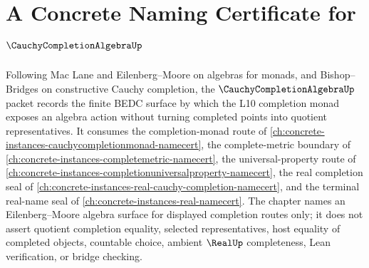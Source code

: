\chapter{A Concrete Naming Certificate for $\CauchyCompletionAlgebraUp$}
\label{ch:concrete-instances-cauchy-completion-algebra-namecert}

Following Mac Lane and Eilenberg--Moore on algebras for monads, and Bishop--Bridges on constructive Cauchy completion, the $\CauchyCompletionAlgebraUp$ packet records the finite BEDC surface by which the L10 completion monad exposes an algebra action without turning completed points into quotient representatives. It consumes the completion-monad route of \autoref{ch:concrete-instances-cauchycompletionmonad-namecert}, the complete-metric boundary of \autoref{ch:concrete-instances-completemetric-namecert}, the universal-property route of \autoref{ch:concrete-instances-completionuniversalproperty-namecert}, the real completion seal of \autoref{ch:concrete-instances-real-cauchy-completion-namecert}, and the terminal real-name seal of \autoref{ch:concrete-instances-real-namecert}. The chapter names an Eilenberg--Moore algebra surface for displayed completion routes only; it does not assert quotient completion equality, selected representatives, host equality of completed objects, countable choice, ambient $\RealUp$ completeness, Lean verification, or bridge checking.

